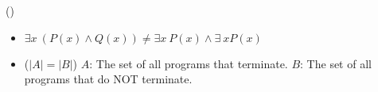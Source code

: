 \item \begin{theorem}{()} \quad\quad
    \begin{itemize}
        \item $\exists x\ (P(x) \land Q(x)) \neq \exists x \ P(x) \land \exists \ x P(x)$
        \item ($|A| = |B|$) $A$: The set of all programs that terminate. $B$: The set of all programs that do NOT terminate. 
    \end{itemize}
\end{theorem}